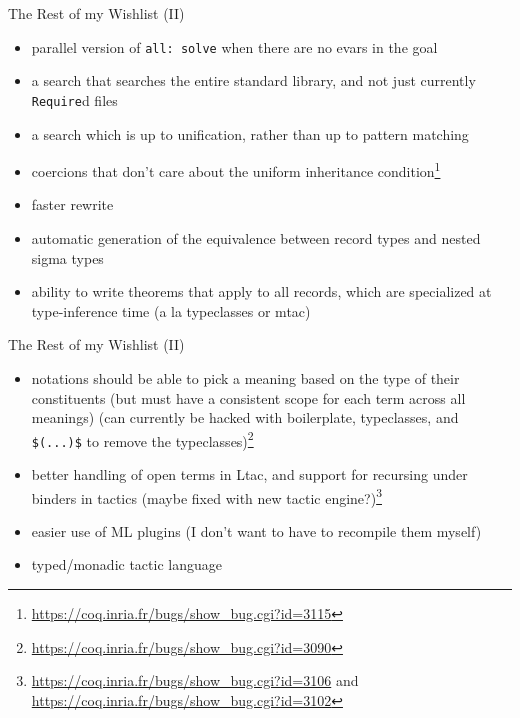 \documentclass{beamer}
\begin{document}
\begin{frame}{The Rest of my Wishlist (II)}
\begin{itemize}
  \item
    parallel version of \texttt{all: solve} when there are no evars in the goal
  \item 
    a search that searches the entire standard library, and not just currently \texttt{Require}d files
  \item 
    a search which is up to unification, rather than up to pattern matching
  \item 
    coercions that don't care about the uniform inheritance condition\footnote{\url{https://coq.inria.fr/bugs/show\_bug.cgi?id=3115}}
  \item 
    faster rewrite
  \item 
    automatic generation of the equivalence between record types and nested sigma types
  \item 
    ability to write theorems that apply to all records, which are specialized at type-inference time (a la typeclasses or mtac)
\end{itemize}
\end{frame}

\begin{frame}{The Rest of my Wishlist (II)}
\begin{itemize}
  \item
    notations should be able to pick a meaning based on the type of their constituents (but must have a consistent scope for each term across all meanings) (can currently be hacked with boilerplate, typeclasses, and \texttt{\$(...)\$} to remove the typeclasses)\footnote{\url{https://coq.inria.fr/bugs/show\_bug.cgi?id=3090}}
  \item 
    better handling of open terms in Ltac, and support for recursing under binders in tactics (maybe fixed with new tactic engine?)\footnote{\url{https://coq.inria.fr/bugs/show\_bug.cgi?id=3106} and \url{https://coq.inria.fr/bugs/show\_bug.cgi?id=3102}}
  \item 
    easier use of ML plugins (I don't want to have to recompile them myself)
  \item
    typed/monadic tactic language
\end{itemize}
\end{frame}
\end{document}
